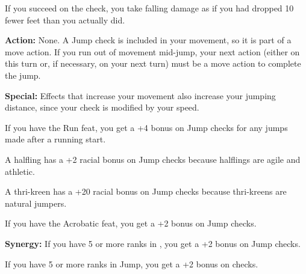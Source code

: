 If you succeed on the check, you take falling damage as if you had dropped 10 fewer feet than you actually did.

\textbf{Action:} None. A Jump check is included in your movement, so it is part of a move action. If you run out of movement mid-jump, your next action (either on this turn or, if necessary, on your next turn) must be a move action to complete the jump.

\textbf{Special:} Effects that increase your movement also increase your jumping distance, since your check is modified by your speed.

If you have the Run feat, you get a +4 bonus on Jump checks for any jumps made after a running start.

A halfling has a +2 racial bonus on Jump checks because halflings are agile and athletic.

A thri-kreen has a +20 racial bonus on Jump checks because thri-kreens are natural jumpers.

If you have the Acrobatic feat, you get a +2 bonus on Jump checks.

\textbf{Synergy:} If you have 5 or more ranks in , you get a +2 bonus on Jump checks.

If you have 5 or more ranks in Jump, you get a +2 bonus on  checks.
